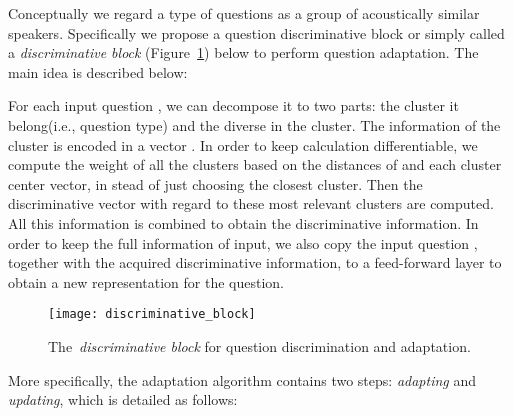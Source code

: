 \documentclass{article}
\begin{document}
Conceptually we regard a type of questions as a group of acoustically similar speakers. Specifically we propose a question discriminative block or simply called a \textit{discriminative block} (Figure~\ref{fig:discriminative_block}) below to perform question adaptation. 
The main idea is described below:



For each input question , we can decompose it to two parts: the cluster it belong(i.e., question type) and the diverse in the cluster. The information of the cluster is encoded in a vector . In order to keep calculation differentiable, we compute the weight of all the clusters based on the distances of  and each cluster center vector, in stead of just choosing the closest cluster. Then the discriminative vector  with regard to these most relevant clusters are computed. All this information is combined to obtain the discriminative information. In order to keep the full information of input, we also copy the input question , together with the acquired discriminative information, to a feed-forward layer to obtain a new representation  for the question. 


\begin{figure}[h]
	\centering
	\texttt{[image: discriminative\_block]}
	\caption{The~\textit{discriminative block} for question discrimination and adaptation.}
	\label{fig:discriminative_block}
\end{figure}

More specifically, the adaptation algorithm contains two steps: \textit{adapting} and \textit{updating}, which is detailed as follows:
 
\end{document}
